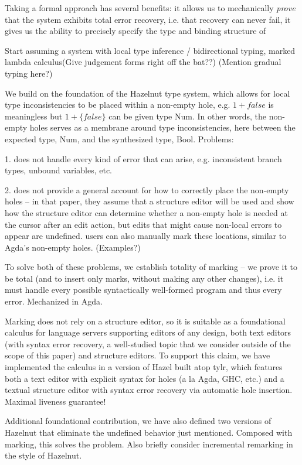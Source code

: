 Taking a formal approach has several benefits: it allows us to mechanically \emph{prove} that the system exhibits total error recovery, i.e. that recovery can never fail, 
it gives us the ability to precisely specify the type and binding structure of 


Start assuming a system with local type inference / bidirectional typing, marked lambda calculus(Give judgement forms right off the bat??) 
(Mention gradual typing here?)

We build on the foundation of the Hazelnut type system, which allows for local type inconsistencies to be placed within a non-empty hole, 
e.g. $1 + false$ is meaningless but $1 + \{false\}$ can be given type Num. In other words, the non-empty holes serves as a membrane around type inconsistencies, here between the expected type, Num, and the synthesized type, Bool. Problems:

1. does not handle every kind of error that can arise, e.g. inconsistent branch types, unbound variables, etc.

2. does not provide a general account for how to correctly place the non-empty holes -- in that paper, they assume that a structure editor will be used and show how the structure editor can determine whether a non-empty hole is needed at the cursor after an edit action, but edits that might cause non-local errors to appear are undefined. users can also manually mark these locations, similar to Agda's non-empty holes. (Examples?)

To solve both of these problems, we establish totality of marking -- we prove it to be total (and to insert only marks, without making any other changes), i.e. it must handle 
every possible syntactically well-formed program and thus every error. Mechanized in Agda.

Marking does not rely on a structure editor, so it is suitable as a foundational calculus for language servers supporting editors of any 
design, both text editors (with syntax error recovery, a well-studied topic that we consider outside of the scope of this paper) and structure editors. To support this claim, we have implemented the calculus in a version of Hazel built atop tylr, which features both a text editor with explicit syntax for holes (a la Agda, GHC, etc.) and a textual structure editor with syntax error recovery via automatic hole insertion. Maximal liveness guarantee! 

Additional foundational contribution, we have also defined two versions of Hazelnut that eliminate the undefined behavior just mentioned. Composed with marking, this solves the problem. Also briefly consider incremental remarking in the style of Hazelnut.

